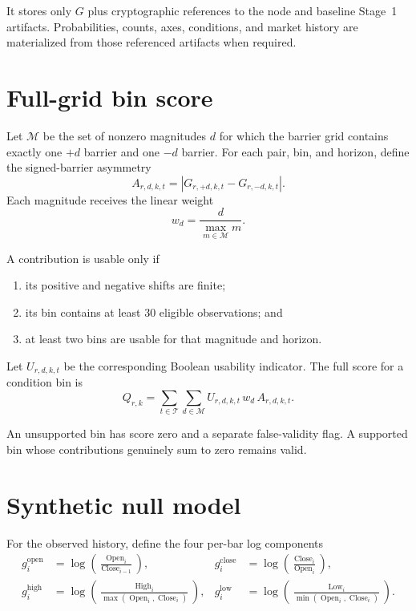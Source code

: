 \documentclass[11pt]{article}
\DeclareMathOperator{\Close}{Close}
\DeclareMathOperator{\Open}{Open}
\DeclareMathOperator{\High}{High}
\DeclareMathOperator{\Low}{Low}
\begin{document}
It stores only $G$ plus cryptographic references to the node and baseline
Stage~1 artifacts. Probabilities, counts, axes, conditions, and market history
are materialized from those referenced artifacts when required.

\section{Full-grid bin score}\label{sec:score}

Let $\mathcal M$ be the set of nonzero magnitudes $d$ for which the barrier grid
contains exactly one $+d$ barrier and one $-d$ barrier. For each pair, bin, and
horizon, define the signed-barrier asymmetry
\begin{equation}
A_{r,d,k,t}
=\left|G_{r,+d,k,t}-G_{r,-d,k,t}\right|.
\end{equation}
Each magnitude receives the linear weight
\begin{equation}
w_d=\frac{d}{\max_{m\in\mathcal M}m}.
\end{equation}

A contribution is usable only if
\begin{enumerate}[nosep]
  \item its positive and negative shifts are finite;
  \item its bin contains at least 30 eligible observations; and
  \item at least two bins are usable for that magnitude and horizon.
\end{enumerate}

Let $U_{r,d,k,t}$ be the corresponding Boolean usability indicator. The full
score for a condition bin is
\begin{equation}
Q_{r,k}
=\sum_{t\in\mathcal T}\sum_{d\in\mathcal M}
 U_{r,d,k,t}\,w_d\,A_{r,d,k,t}.
\end{equation}

An unsupported bin has score zero and a separate false-validity flag. A
supported bin whose contributions genuinely sum to zero remains valid.

\section{Synthetic null model}

For the observed history, define the four per-bar log components
\begin{align}
g^{\mathrm{open}}_i
  &=\log\!\left(\frac{\Open_i}{\Close_{i-1}}\right), &
g^{\mathrm{close}}_i
  &=\log\!\left(\frac{\Close_i}{\Open_i}\right),\\
g^{\mathrm{high}}_i
  &=\log\!\left(\frac{\High_i}{\max(\Open_i,\Close_i)}\right), &
g^{\mathrm{low}}_i
  &=\log\!\left(\frac{\Low_i}{\min(\Open_i,\Close_i)}\right).
\end{align}
\end{document}
